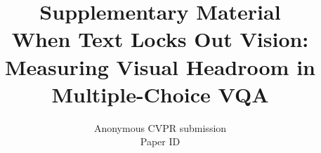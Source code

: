 \documentclass[10pt,twocolumn,letterpaper]{article}
\title{Supplementary Material\\When Text Locks Out Vision: Measuring Visual Headroom in Multiple-Choice VQA}
\author{Anonymous CVPR submission\\Paper ID \paperID}
\begin{document}
\maketitle
\appendix




{
    \small
    
    
}
\end{document}
